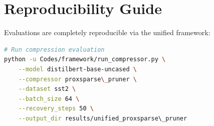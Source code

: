 \section{Reproducibility Guide}
Evaluations are completely reproducible via the unified framework:
\begin{lstlisting}[language=bash]
# Run compression evaluation
python -u Codes/framework/run_compressor.py \
    --model distilbert-base-uncased \
    --compressor proxsparse\_pruner \
    --dataset sst2 \
    --batch_size 64 \
    --recovery_steps 50 \
    --output_dir results/unified_proxsparse\_pruner
\end{lstlisting}
